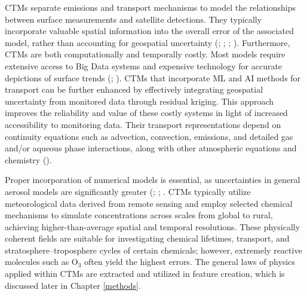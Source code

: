 CTMs separate emissions and transport mechanisms to model the relationships between surface measurements and satellite detections. They typically incorporate valuable spatial information into the overall error of the associated model, rather than accounting for geospatial uncertainty (\cite{konovalov_inverse_2006}; \cite{lin_model_2012}; \cite{minarro_study_2011}; \cite{rojas_uncertainty_2016}). Furthermore, CTMs are both computationally and temporally costly. Most models require extensive access to Big Data systems and expensive technology for accurate depictions of surface trends (\cite{brown_running_1995}; \cite{keller_machine_2017}). CTMs that incorporate ML and AI methods for transport can be further enhanced by effectively integrating geospatial uncertainty from monitored data through residual kriging. This approach improves the reliability and value of these costly systems in light of increased accessibility to monitoring data. Their transport representations depend on continuity equations such as advection, convection, emissions, and detailed gas and/or aqueous phase interactions, along with other atmospheric equations and chemistry (\cite{petetin_model_2021}).

Proper incorporation of numerical models is essential, as uncertainties in general aerosol models are significantly greater (\cite{lin_modeling_2012}; \cite{minarro_study_2011}; \cite{rojas_uncertainty_2016}. CTMs typically utilize meteorological data derived from remote sensing and employ selected chemical mechanisms to simulate concentrations across scales from global to rural, achieving higher-than-average spatial and temporal resolutions. These physically coherent fields are suitable for investigating chemical lifetimes, transport, and stratosphere–troposphere cycles of certain chemicals; however, extremely reactive molecules such as O$_3$ often yield the highest errors. The general laws of physics applied within CTMs are extracted and utilized in feature creation, which is discussed later in Chapter \ref{methods}.

